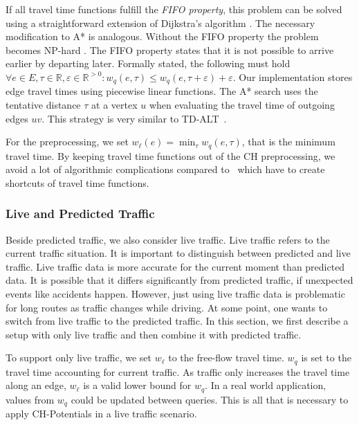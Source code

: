 \documentclass[manuscript,review]{acmart}
\begin{document}
If all travel time functions fulfill the \emph{FIFO property}, this problem can be solved using a straightforward extension of Dijkstra's algorithm \cite{d-aassp-69}.
The necessary modification to A* is analogous.
Without the FIFO property the problem becomes NP-hard \cite{or-tnp-89,z-nphsp-22}.
The FIFO property states that it is not possible to arrive earlier by departing later.
Formally stated, the following must hold $\forall e\in E,\tau\in \mathbb{R},\varepsilon\in \mathbb{R}^{>0}: w_q(e, \tau) \le w_q(e, \tau+\varepsilon) + \varepsilon$.
Our implementation stores edge travel times using piecewise linear functions.
The A* search uses the tentative distance $\tau$ at a vertex $u$ when evaluating the travel time of outgoing edges $u v$.
This strategy is very similar to TD-ALT~\cite{ndls-bastd-12,dw-lbrdg-07}.

For the preprocessing, we set $w_\ell(e) = \min_\tau w_q(e,\tau)$, that is the minimum travel time.
By keeping travel time functions out of the CH preprocessing, we avoid a lot of algorithmic complications compared to~\cite{bgsv-mtdtt-13,bdpw-dtdrp-16,swz-sfert-21,dn-crdtd-12} which have to create shortcuts of travel time functions.

\subsubsection{Live and Predicted Traffic}
\label{sec:live-predicted-traffic}

Beside predicted traffic, we also consider live traffic.
Live traffic refers to the current traffic situation.
It is important to distinguish between predicted and live traffic.
Live traffic data is more accurate for the current moment than predicted data.
It is possible that it differs significantly from predicted traffic, if unexpected events like accidents happen.
However, just using live traffic data is problematic for long routes as traffic changes while driving.
At some point, one wants to switch from live traffic to the predicted traffic.
In this section, we first describe a setup with only live traffic and then combine it with predicted traffic.

To support only live traffic, we set $w_\ell$ to the free-flow travel time.
$w_q$ is set to the travel time accounting for current traffic.
As traffic only increases the travel time along an edge, $w_\ell$ is a valid lower bound for $w_q$.
In a real world application, values from $w_q$ could be updated between queries.
This is all that is necessary to apply CH-Potentials in a live traffic scenario.
\end{document}
